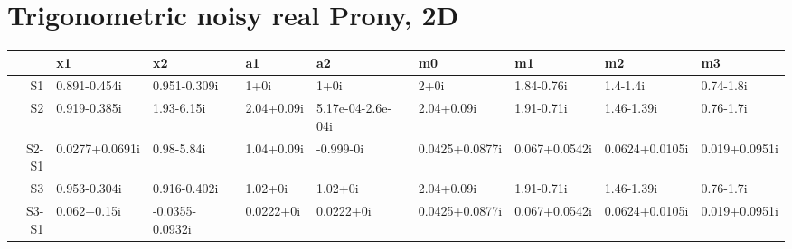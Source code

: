 \section{Trigonometric noisy real Prony, 2D}

\begin{table}
\centering
\begin{tabular}{rllllllll}
  \hline
 & x1 & x2 & a1 & a2 & m0 & m1 & m2 & m3 \\ 
  \hline
S1 & 0.891-0.454i & 0.951-0.309i & 1+0i & 1+0i & 2+0i & 1.84-0.76i & 1.4-1.4i & 0.74-1.8i \\ 
  S2 & 0.919-0.385i & 1.93-6.15i & 2.04+0.09i & 5.17e-04-2.6e-04i & 2.04+0.09i & 1.91-0.71i & 1.46-1.39i & 0.76-1.7i \\ 
  S2-S1 & 0.0277+0.0691i & 0.98-5.84i & 1.04+0.09i & -0.999-0i & 0.0425+0.0877i & 0.067+0.0542i & 0.0624+0.0105i & 0.019+0.0951i \\ 
   \hline
  S3 & 0.953-0.304i & 0.916-0.402i & 1.02+0i & 1.02+0i & 2.04+0.09i & 1.91-0.71i & 1.46-1.39i & 0.76-1.7i \\ 
  S3-S1 & 0.062+0.15i & -0.0355-0.0932i & 0.0222+0i & 0.0222+0i & 0.0425+0.0877i & 0.067+0.0542i & 0.0624+0.0105i & 0.019+0.0951i \\ 
   \hline
\end{tabular}
\end{table}
  
  